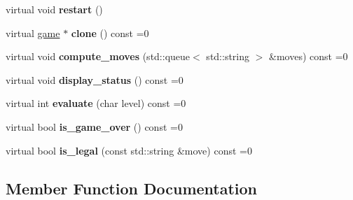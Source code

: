 \begin{DoxyCompactItemize}
\item 
virtual void {\bfseries restart} ()\hypertarget{classmain__savitch__14_1_1game_ad521a7d78e7c163a0bc28b709f0d45fd}{}\label{classmain__savitch__14_1_1game_ad521a7d78e7c163a0bc28b709f0d45fd}

\item 
virtual \hyperlink{classmain__savitch__14_1_1game}{game} $\ast$ {\bfseries clone} () const =0\hypertarget{classmain__savitch__14_1_1game_a7b663057f59210dd52738facfc40d959}{}\label{classmain__savitch__14_1_1game_a7b663057f59210dd52738facfc40d959}

\item 
virtual void {\bfseries compute\+\_\+moves} (std\+::queue$<$ std\+::string $>$ \&moves) const =0\hypertarget{classmain__savitch__14_1_1game_a2c0c049f5861026d0f639b5837889b7a}{}\label{classmain__savitch__14_1_1game_a2c0c049f5861026d0f639b5837889b7a}

\item 
virtual void {\bfseries display\+\_\+status} () const =0\hypertarget{classmain__savitch__14_1_1game_ac8205178922c49bab2865187e834b726}{}\label{classmain__savitch__14_1_1game_ac8205178922c49bab2865187e834b726}

\item 
virtual int {\bfseries evaluate} (char level) const =0\hypertarget{classmain__savitch__14_1_1game_a51429d44d3b51710fa8c9a34a8f2635e}{}\label{classmain__savitch__14_1_1game_a51429d44d3b51710fa8c9a34a8f2635e}

\item 
virtual bool {\bfseries is\+\_\+game\+\_\+over} () const =0\hypertarget{classmain__savitch__14_1_1game_a49eed20648918b03fd3e2cf78987b3d1}{}\label{classmain__savitch__14_1_1game_a49eed20648918b03fd3e2cf78987b3d1}

\item 
virtual bool {\bfseries is\+\_\+legal} (const std\+::string \&move) const =0\hypertarget{classmain__savitch__14_1_1game_ad38351422ca1ee3ae58440c1c6b36b30}{}\label{classmain__savitch__14_1_1game_ad38351422ca1ee3ae58440c1c6b36b30}

\end{DoxyCompactItemize}


\subsection{Member Function Documentation}
